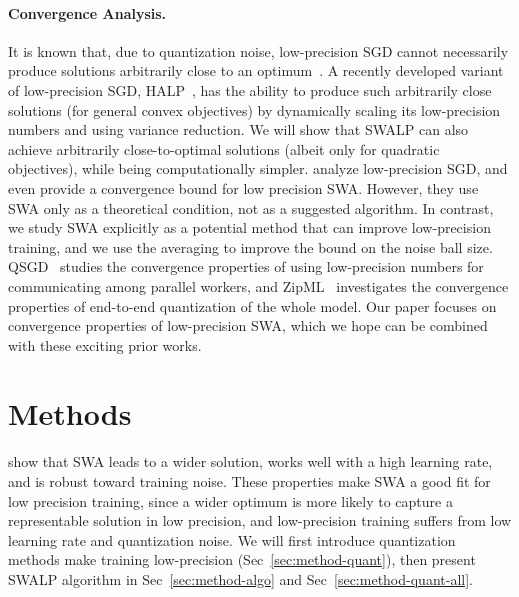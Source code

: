 \documentclass{article}
\begin{document}
\paragraph{Convergence Analysis.}
It is known that, due to quantization noise, low-precision SGD cannot necessarily produce solutions arbitrarily close to an optimum~\cite{training-quantized-network-deeper-understanding}.
A recently developed variant of low-precision SGD, HALP~\cite{HALP}, has the ability to produce such arbitrarily close solutions (for general convex objectives) by dynamically scaling its low-precision numbers and using variance reduction. %
We will show that SWALP can also achieve arbitrarily close-to-optimal solutions (albeit only for quadratic objectives), while being computationally simpler.
\citet{training-quantized-network-deeper-understanding} analyze low-precision SGD, and even provide a convergence bound for low precision SWA. However, they use SWA only as a theoretical condition, not as a suggested algorithm.
In contrast, we study SWA explicitly as a potential method that can improve low-precision training, and we use the averaging to improve the bound on the noise ball size.
QSGD~\cite{QSGD} studies the convergence properties of using low-precision numbers for communicating among parallel workers, and ZipML~\cite{ZipML} investigates the convergence properties of end-to-end quantization of the whole model. 
Our paper focuses on convergence properties of low-precision SWA, which we hope can be combined with these exciting prior works.


\section{Methods}\label{sec:method}

\citet{SWA} show that SWA leads to a wider solution, works well with a high learning rate, and is robust toward training noise.
These properties make SWA a good fit for low precision training, since a wider optimum is more likely to capture a representable solution in low precision, and low-precision training suffers from low learning rate and quantization noise.
We will first introduce quantization methods make training low-precision (Sec~\ref{sec:method-quant}), then present SWALP algorithm in Sec~\ref{sec:method-algo} and Sec~\ref{sec:method-quant-all}.
\end{document}
